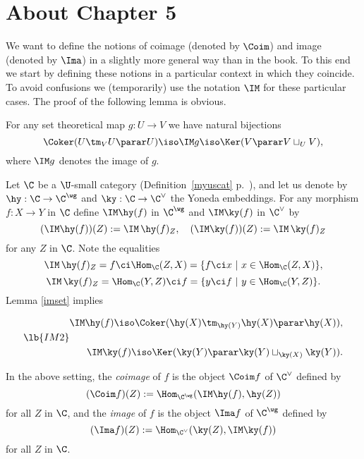 \documentclass[12pt]{article}
\theoremstyle{remark}
\theoremstyle{definition}
\begin{document}

\section{About Chapter 5}


We want to define the notions of coimage (denoted by $\Coim$) and image (denoted by $\Ima$) in a slightly more general way than in the book. To this end we start by defining these notions in a particular context in which they coincide. To avoid confusions we (temporarily) use the notation $\IM$ for these particular cases. The proof of the following lemma is obvious. 

\begin{lem} 
For any set theoretical map $g:U\to V$ we have natural bijections 
$$ 
\Coker(U\tm_VU\parar U)\iso\IM g\iso\Ker(V\parar V\sqcup_UV),
$$ 
where $\IM g$ denotes the image of $g$. 
\end{lem} 

Let $\C$ be a $\U$-small category (Definition~\ref{myuscat} p.~), and let us denote by $\hy:\C\to\C^\wg$ and $\ky:\C\to\C^\vee$ the Yoneda embeddings. For any morphism $f:X\to Y$ in $\C$ define $\IM\hy(f)$ in $\C^\wg$ and $\IM\ky(f)$ in $\C^\vee$ by
$$
(\IM\hy(f))(Z):=\IM\,\hy(f)_Z,\quad(\IM\ky(f))(Z):=\IM\,\ky(f)_Z 
$$
for any $Z$ in $\C$. Note the equalities 
$$
\IM\,\hy(f)_Z=f\ci\Hom_\C(Z,X)=\{f\ci x\ |\ x\in\Hom_\C(Z,X)\},
$$ 
$$
\IM\,\ky(f)_Z=\Hom_\C(Y,Z)\ci f=\{y\ci f\ |\ y\in\Hom_\C(Y,Z)\}.
$$ 
Lemma \ref{imset} implies

\begin{equation}\lb{IM2}
\begin{split}
\IM\hy(f)\iso\Coker(\hy(X)\tm_{\hy(Y)}\hy(X)\parar\hy(X)),\\ \\ 
\IM\ky(f)\iso\Ker(\ky(Y)\parar\ky(Y)\sqcup_{\ky(X)}\ky(Y)).
\end{split}
\end{equation}

\begin{df}%
In the above setting, the {\em coimage} of $f$ is the object $\Coim f$ of $\C^\vee$ defined by 
$$ 
(\Coim f)(Z):=\Hom_{\C^\wg}(\IM\hy(f),\hy(Z))
$$ 
for all $Z$ in $\C$, and the {\em image} of $f$ is the object $\Ima f$ of $\C^\wg$ defined by 
$$ 
(\Ima f)(Z):=\Hom_{\C^\vee}(\ky(Z),\IM\ky(f)) 
$$ 
for all $Z$ in $\C$. 
\end{df} 
\end{document}
